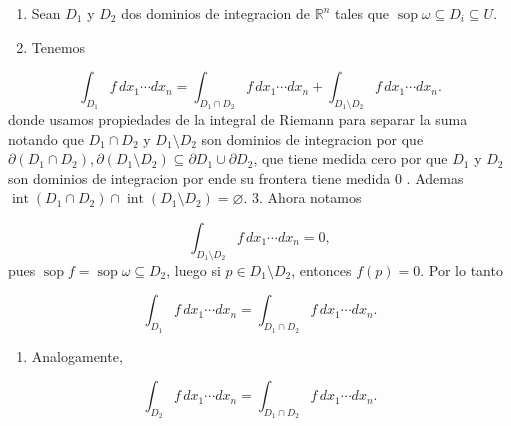 \begin{bookproof}{}
\begin{enumerate}
\item Sean $D_1$ y $D_2$ dos dominios de integracion de $\mathbb R^n$ tales que $\operatorname{sop}\omega\subseteq D_i\subseteq U$.
\item Tenemos
\end{enumerate}
\[
\int_{D_1}f\,dx_1\cdots dx_n=\int_{D_1\cap D_2}f\,dx_1\cdots dx_n+\int_{D_1\setminus D_2}f\,dx_1\cdots dx_n.
\]
donde usamos propiedades de la integral de Riemann para separar la suma notando que $D_1\cap D_2$ y $D_1\setminus D_2$ son dominios de integracion por que $\partial(D_1\cap D_2),\partial(D_1\setminus D_2)\subseteq\partial D_1\cup\partial D_2$, que tiene medida cero por que $D_{1}$ y $D_{2}$ son dominios de integracion por ende su frontera tiene medida $0$ . Ademas $\operatorname{int}(D_1\cap D_2)\cap\operatorname{int}(D_1\setminus D_2)=\varnothing$. 3. Ahora notamos

\[
\int_{D_1\setminus D_2}f\,dx_1\cdots dx_n=0,
\]
pues $\operatorname{sop}f=\operatorname{sop}\omega\subseteq D_2$, luego si $p\in D_1\setminus D_2$, entonces $f(p)=0$. Por lo tanto

\[
\int_{D_1}f\,dx_1\cdots dx_n=\int_{D_1\cap D_2}f\,dx_1\cdots dx_n.
\]
\begin{enumerate}[start=4]
\item Analogamente,
\end{enumerate}
\[
\int_{D_2}f\,dx_1\cdots dx_n=\int_{D_1\cap D_2}f\,dx_1\cdots dx_n.
\]
\bookqed
\end{bookproof}
\label{blk:9cae17}
